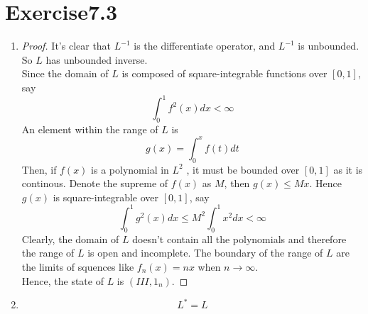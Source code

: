 \documentclass[paper=a4, fontsize=11pt]{scrartcl} %
\numberwithin{equation}{section} %
\numberwithin{figure}{section} %
\numberwithin{table}{section} %
\begin{document}
\section{Exercise7.3}
	\begin{enumerate}
		\item 
			\begin{proof}
				It's clear that $L^{-1}$ is the differentiate operator, and $L^{-1}$ is unbounded. So $L$ has unbounded inverse.\\
				Since the domain of $L$ is composed of square-integrable functions over $[0,1]$, say
				\begin{equation}
					\int_{0}^{1} f^2(x) dx < \infty
				\end{equation}
				An element within the range of $L$ is
				\begin{equation}
					g(x) = \int_{0}^{x} f(t) dt
				\end{equation}
				Then, if $f(x)$ is a polynomial in $L^2$ , it must be bounded over $[0, 1]$ as it is continous. Denote the supreme of $f(x)$ as $M$, then $g(x) \leq Mx$. Hence $g(x)$ is square-integrable over $[0,1]$, say
				\begin{equation}
					\int_{0}^{1} g^2(x) dx \leq M^2 \int_{0}^{1} x^2 dx < \infty
				\end{equation}
				Clearly, the domain of $L$ doesn't contain all the polynomials and therefore the range of $L$ is open and incomplete. The boundary of the range of $L$ are the limits of squences like $f_n(x) = nx$ when $n\rightarrow \infty$.\\
				Hence, the state of $L$ is $(III, 1_n)$.
			\end{proof}
		\item 
			\begin{equation}
				L^* = L
			\end{equation}
		
	\end{enumerate}
\end{document}
